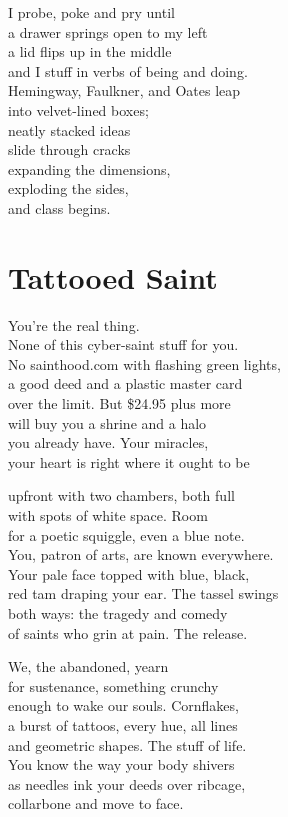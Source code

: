 \documentclass[twoside,10pt]{book}
\begin{document}
I probe, poke and pry until\\
a drawer springs open to my left\\
a lid flips up in the middle\\
and I stuff in verbs of being and doing.\\
Hemingway, Faulkner, and Oates leap\\
into velvet-lined boxes;\\
neatly stacked ideas\\
slide through cracks\\
expanding the dimensions,\\
exploding the sides,\\
and class begins.


\clearpage
\section{Tattooed Saint}

You're the real thing.\\
None of this cyber-saint stuff for you.\\
No sainthood.com with flashing green lights,\\
a good deed and a plastic master card\\
over the limit. But \$24.95 plus more\\
will buy you a shrine and a halo\\
you already have. Your miracles,\\
your heart is right where it ought to be

upfront with two chambers, both full\\
with spots of white space. Room\\
for a poetic squiggle, even a blue note.\\
You, patron of arts, are known everywhere.\\
Your pale face topped with blue, black,\\
red tam draping your ear. The tassel swings\\
both ways: the tragedy and comedy\\
of saints who grin at pain. The release.

We, the abandoned, yearn\\
for sustenance, something crunchy\\
enough to wake our souls. Cornflakes,\\
a burst of tattoos, every hue, all lines\\
and geometric shapes. The stuff of life.\\
You know the way your body shivers\\
as needles ink your deeds over ribcage,\\
collarbone and move to face.
\end{document}
